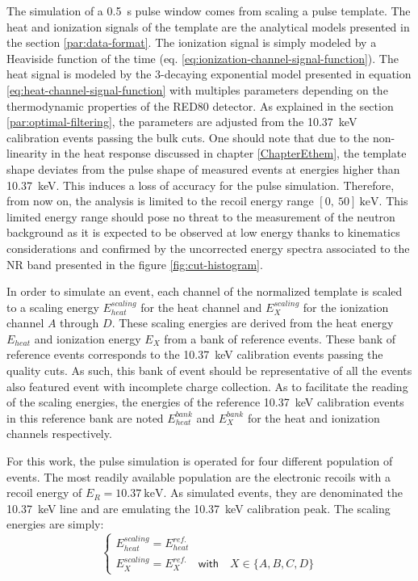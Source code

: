 
The simulation of a \SI{0.5}{\s} pulse window comes from scaling a pulse template. The heat and ionization signals of the template are the analytical models presented in the section \ref{par:data-format}. The ionization signal is simply modeled by a Heaviside function of the time (eq. \ref{eq:ionization-channel-signal-function}). The heat signal is modeled by the 3-decaying exponential model presented in equation \ref{eq:heat-channel-signal-function} with multiples parameters depending on the thermodynamic properties of the RED80 detector. As explained in the section \ref{par:optimal-filtering}, the parameters are adjusted from the \SI{10.37}{\kilo\eV} calibration events passing the bulk cuts. One should note that due to the non-linearity in the heat response discussed in chapter \ref{ChapterEthem}, the template shape deviates from the pulse shape of measured events at energies higher than \SI{10.37}{\kilo\eV}. This induces a loss of accuracy for the pulse simulation. Therefore, from now on, the analysis is limited to the recoil energy range $[0,\ 50]\ \si{\kilo\eV}$. This limited energy range should pose no threat to the measurement of the neutron background as it is expected to be observed at low energy thanks to kinematics considerations and confirmed by the uncorrected energy spectra associated to the NR band presented in the figure \ref{fig:cut-histogram}.

In order to simulate an event, each channel of the normalized template is scaled to a scaling energy $E_{heat}^{scaling}$ for the heat channel and $E_{X}^{scaling}$ for the ionization channel $A$ through $D$. 
These scaling energies are derived from the heat energy $E_{heat}$ and ionization energy $E_{X}$ from a bank of reference events. These bank of reference events corresponds to the \SI{10.37}{\kilo\eV} calibration events passing the quality cuts. As such, this bank of event should be representative of all the events also featured event with incomplete charge collection. As to facilitate the reading of the scaling energies, the energies of the reference \SI{10.37}{\kilo\eV} calibration events in this reference bank are noted $E_{heat}^{bank}$ and $E_{X}^{bank}$  for the heat and ionization channels respectively.

For this work, the pulse simulation is operated for four different population of events. The most readily available population are the electronic recoils with a recoil energy of $E_R = \SI{10.37}{\kilo\eV}$. As simulated events, they are denominated the \SI{10.37}{\kilo\eV} line and are emulating the \SI{10.37}{\kilo\eV} calibration peak. The scaling energies are simply:
\begin{equation}
\begin{cases}
\displaystyle
E_{heat}^{scaling} = E_{heat}^{ref.}
\\
\displaystyle
E_{X}^{scaling} = E_{X}^{ref.} \quad \textsf{with} \quad X \in \{A,B,C,D\}
\end{cases}
\end{equation}


